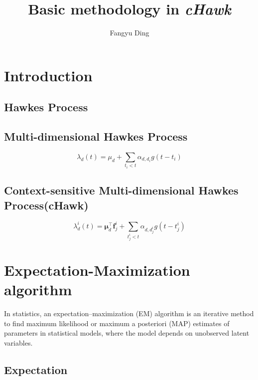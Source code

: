 \documentclass{article}
\title{Basic methodology in \textit{cHawk}}
\author{Fangyu Ding}
\begin{document}
	\maketitle
	
	\tableofcontents
	
	\newpage
	
	\section{Introduction}
	
		\subsection{Hawkes Process}
		
		\subsection{Multi-dimensional Hawkes Process}
		
		\begin{equation}
		\lambda_{d}(t)=\mu_{d}+\sum_{t_{i}<t} \alpha_{d, d_{i}} g\left(t-t_{i}\right)
		\end{equation}
		
		\subsection{Context-sensitive Multi-dimensional Hawkes Process(cHawk)}
		
		\begin{equation}
		\lambda_{d}^{i}(t)=\boldsymbol{\mu}_{d}^{\top} \boldsymbol{f}_{j}^{i}+\sum_{t_{j}^{i}<t} \alpha_{d, d_{j}^{i}} g\left(t-t_{j}^{i}\right)
		\end{equation}
	
	\section{Expectation-Maximization algorithm}
	
	In statistics, an expectation–maximization (EM) algorithm is an iterative method to find maximum likelihood or maximum a posteriori (MAP) estimates of parameters in statistical models, where the model depends on unobserved latent variables.
	
		\subsection{Expectation}
		
\end{document}
